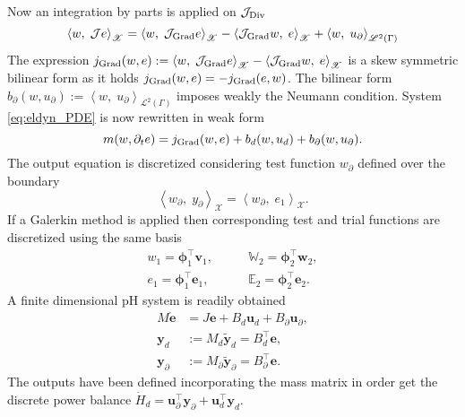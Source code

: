 Now an integration by parts is applied on $\mathcal{J}_{\operatorname*{Div}}$
\begin{equation}
\left\langle w, \; \mathcal{J} e \right\rangle_{\mathscr{X}} = \left\langle w, \; \mathcal{J}_{\operatorname*{Grad}} e \right\rangle_{\mathscr{X}} - \left\langle \mathcal{J}_{\operatorname*{Grad}} w, \; e \right\rangle_{\mathscr{X}} + \left\langle w, \; u_\partial \right\rangle_{\mathscr{L}^2(\Gamma)}
\end{equation}
The expression $j_{\operatorname*{Grad}}(w, e) :=\left\langle w, \; \mathcal{J}_{\operatorname*{Grad}} e \right\rangle_{\mathscr{X}} - \left\langle \mathcal{J}_{\operatorname*{Grad}} w, \; e \right\rangle_{\mathscr{X}}$ is a skew symmetric bilinear form as it holds $j_{\operatorname*{Grad}}(w, e)=-j_{\operatorname*{Grad}}(e, w)$. The bilinear form $b_{\partial}(w, u_\partial) := \left\langle w, \; u_\partial \right\rangle_{\mathscr{L}^2(\Gamma)}$ imposes weakly the Neumann condition. System \eqref{eq:eldyn_PDE} is now rewritten in weak form
\begin{equation}
m(w, \partial_t e) = j_{\operatorname*{Grad}}(w, e) + b_d(w, u_d) + b_{\partial}(w, u_\partial).
\end{equation}
The output equation is discretized considering test function $w_\partial$ defined over the boundary
\begin{equation}
\left\langle w_\partial, \; y_\partial \right\rangle_{\mathscr{X}} = \left\langle w_\partial, \; e_1 \right\rangle_{\mathscr{X}}.
\end{equation}
If a Galerkin method is applied then corresponding test and trial functions are discretized using the same basis
\begin{equation*}
\begin{aligned}
w_1 = \bm{\phi}_1^\top \bm{v}_1, \\
e_1 = \bm{\phi}_1^\top \bm{e}_1, 
\end{aligned} \qquad
\begin{aligned}
\mathbb{W}_2 = \bm{\phi}_2^\top \bm{w}_2, \\
\mathbb{E}_2 = \bm{\phi}_2^\top \bm{e}_2. 
\end{aligned}
\end{equation*}
A finite dimensional pH system is readily obtained
\begin{equation}
\begin{aligned}
{M} \dot{\bm{e}} &= J \bm{e} + {B}_d \bm{u}_d + {B}_\partial \bm{u}_\partial, \\
\bm{y}_d &:= {M}_d \widetilde{\bm{y}}_d = {B}_d^\top \bm{e},  \\
\bm{y}_\partial &:= {M}_\partial \widetilde{\bm{y}}_\partial = {B}_\partial^\top \bm{e}.
\end{aligned}
\end{equation}
The outputs have been defined incorporating the mass matrix in order get the discrete power balance $\dot{H}_d = \bm{u}_\partial^\top \bm{y}_\partial + \bm{u}_d^\top \bm{y}_d$.

